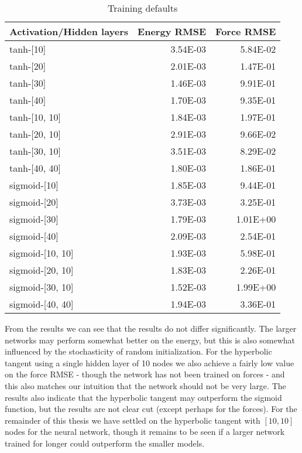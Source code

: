 \begin{table}[H]
\centering
\begin{tabular}{lrr}
\toprule
Activation/Hidden layers &  Energy RMSE &  Force RMSE \\
\midrule
               tanh-[10] &     3.54E-03 &    5.84E-02 \\
               tanh-[20] &     2.01E-03 &    1.47E-01 \\
               tanh-[30] &     1.46E-03 &    9.91E-01 \\
               tanh-[40] &     1.70E-03 &    9.35E-01 \\
           tanh-[10, 10] &     1.84E-03 &    1.97E-01 \\
           tanh-[20, 10] &     2.91E-03 &    9.66E-02 \\
           tanh-[30, 10] &     3.51E-03 &    8.29E-02 \\
           tanh-[40, 40] &     1.80E-03 &    1.86E-01 \\
            sigmoid-[10] &     1.85E-03 &    9.44E-01 \\
            sigmoid-[20] &     3.73E-03 &    3.25E-01 \\
            sigmoid-[30] &     1.79E-03 &    1.01E+00 \\
            sigmoid-[40] &     2.09E-03 &    2.54E-01 \\
        sigmoid-[10, 10] &     1.93E-03 &    5.98E-01 \\
        sigmoid-[20, 10] &     1.83E-03 &    2.26E-01 \\
        sigmoid-[30, 10] &     1.52E-03 &    1.99E+00 \\
        sigmoid-[40, 40] &     1.94E-03 &    3.36E-01 \\
\bottomrule
\end{tabular}
\caption{Training defaults}
\label{table:act-hidden}
\end{table}

From the results we can see that the results do not
differ significantly. The larger networks may perform somewhat
better on the energy, but this is also somewhat influenced by the stochasticity
of random initialization. For the hyperbolic tangent using
a single hidden layer of 10 nodes we also achieve a fairly
low value on the force RMSE - though the network has not been trained
on forces - and this also matches our intuition that the network
should not be very large.
The results also indicate that the hyperbolic tangent may outperform
the sigmoid function, but the results are not clear cut (except perhaps
for the forces).
For the remainder of this thesis we have settled
on the hyperbolic tangent with $\left[10, 10\right]$ 
nodes for the neural network, though it remains
to be seen if a larger network trained for longer could outperform
the smaller models.

